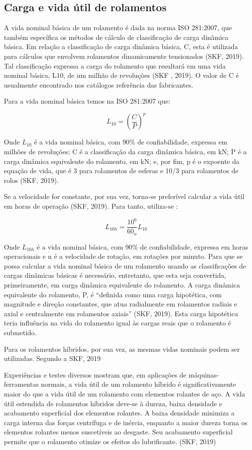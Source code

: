 \documentclass[
	12pt,				
	oneside,			
	a4paper,			
	english,			
	brazil				
	]{abntex2ppgsi}
\begin{document}
\subsection{\textbf{Carga e vida útil de rolamentos}}

A vida nominal básica de um rolamento é dada na norma ISO 281:2007, que também específica os métodos de cálculo de classificação de carga dinâmica básica. Em relação a classificação de carga dinâmica básica, C, esta é utilizada para cálculos que envolvem rolamentos dinamicamente tensionados (SKF, 2019). Tal classificação expressa a carga do rolamento que resultará em uma vida nominal básica, L10, de um milhão de revoluções (SKF , 2019). O valor de C é usualmente encontrado nos catálogos referência das fabricantes.   

Para a vida nominal básica temos na ISO 281:2007 que:

\[L_{10}= \left ( \frac{C}{P} \right )^{p}  \]

Onde $L_{10}$ é a vida nominal básica, com 90\% de confiabilidade, expressa em milhões de revoluções; C é a classificação da carga dinâmica básica, em kN; P é a carga dinâmica equivalente do rolamento, em kN; e, por fim, p é o expoente da equação de vida, que é 3 para rolamentos de esferas e 10/3 para rolamentos de rolos (SKF, 2019).

Se a velocidade for constante, por sua vez, torna-se preferível calcular a vida útil em horas de operação (SKF, 2019). Para tanto, utiliza-se :

\[L_{10h}= \frac{10^{6}}{60_{n}}L_{10}\]

Onde $L_{10h}$ é a vida nominal básica, com 90\% de confiabilidade, expressa em horas operacionais e n é a velocidade de rotação, em rotações por minuto. 
Para que se possa calcular a vida nominal básica de um rolamento usando as classificações de cargas dinâmicas básicas é necessário, entretanto, que esta seja convertida, primeiramente, em carga dinâmica equivalente do rolamento. A carga dinâmica equivalente do rolamento, P, é “definida como uma carga hipotética, com magnitude e direção constantes, que atua radialmente em rolamentos radiais e axial e centralmente em rolamentos axiais” (SKF, 2019). Esta carga hipotética teria influência na vida do rolamento igual às cargas reais que o rolamento é submetido.

Para os rolamentos híbridos, por sua vez, as mesmas vidas nominais podem ser utilizadas. Segundo a SKF, 2019

\begin{citacao}
Experiências e testes diversos mostram que, em aplicações de máquinas-ferramentas normais, a vida útil de um rolamento híbrido é significativamente maior do que a vida útil de um rolamento com elementos rolantes de aço. A vida útil estendida de rolamentos híbridos deve-se à dureza, baixa densidade e acabamento superficial dos elementos rolantes. A baixa densidade minimiza a carga interna das forças centrífuga e de inércia, enquanto a maior dureza torna os elementos rolantes menos suscetíveis ao desgaste. Seu acabamento superficial permite que o rolamento otimize os efeitos do lubrificante. (SKF, 2019)
\end{citacao}
\end{document}

